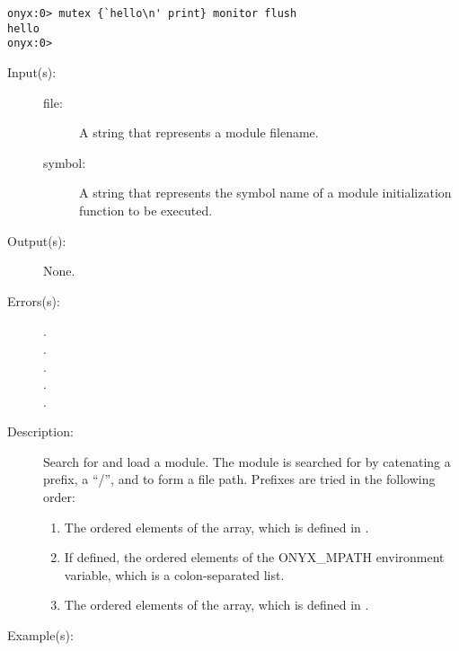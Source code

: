 \begin{description}
\begin{description}
\begin{verbatim}
onyx:0> mutex {`hello\n' print} monitor flush
hello
onyx:0>
		\end{verbatim}
	\end{description}
\label{systemdict:mrequire}
\item[{\onyxop{file symbol}{mrequire}{--}}: ]
	\begin{description}\item[]
	\item[Input(s): ]
		\begin{description}\item[]
		\item[file: ]
			A string that represents a module filename.
		\item[symbol: ]
			A string that represents the symbol name of a
			module initialization function to be executed.
		\end{description}
	\item[Output(s): ] None.
	\item[Errors(s): ]
		\begin{description}\item[]
		\item[.]
		\item[.]
		\item[.]
		\item[.]
		\item[.]
		\end{description}
	\item[Description: ]
		Search for and load a module.  The module is searched for by
		catenating a prefix, a ``/'', and  to form a file
		path.  Prefixes are tried in the following order:
		\begin{enumerate}
			\item{The ordered elements of the
			 array, which is
			defined in .}
			\item{If defined, the ordered elements of the
			ONYX\_MPATH environment variable, which is a
			colon-separated list.}
			\item{The ordered elements of the
			 array, which
			is defined in .}
		\end{enumerate}
	\item[Example(s): ]\begin{verbatim}


\end{verbatim}
\end{description}
\end{description}
